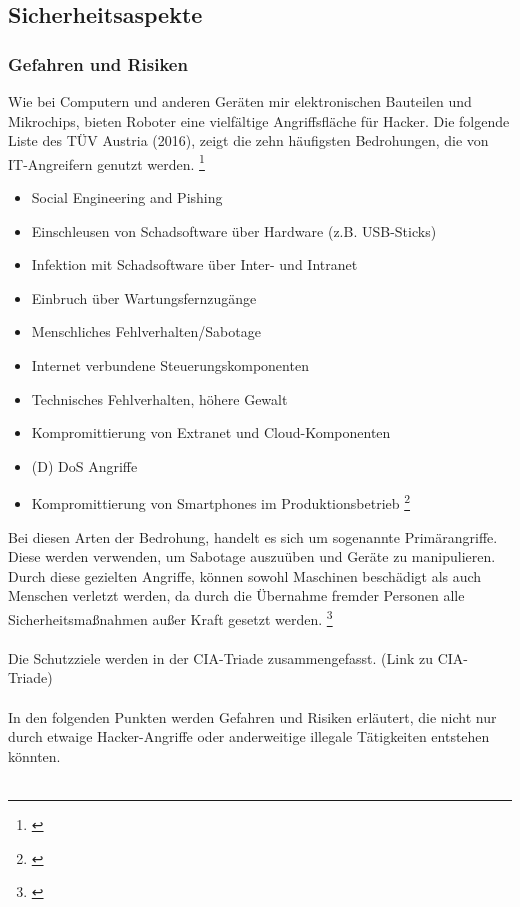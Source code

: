 \documentclass[titlepage,12pt,twoside]{article}
\begin{document}
\subsection{Sicherheitsaspekte}
\subsubsection{Gefahren und Risiken}
Wie bei Computern und anderen Geräten mir elektronischen Bauteilen und Mikrochips, 
bieten Roboter eine vielfältige Angriffsfläche für Hacker. Die folgende Liste des 
TÜV Austria (2016), zeigt die zehn häufigsten Bedrohungen, die von IT-Angreifern 
genutzt werden. \footnote{\cite{TÜVaustria}} \\
\begin{itemize}
	\item Social Engineering and Pishing
	\item Einschleusen von Schadsoftware über Hardware (z.B. USB-Sticks)
	\item Infektion mit Schadsoftware über Inter- und Intranet
	\item Einbruch über Wartungsfernzugänge
	\item Menschliches Fehlverhalten/Sabotage
	\item Internet verbundene Steuerungskomponenten
	\item Technisches Fehlverhalten, höhere Gewalt
	\item Kompromittierung von Extranet und Cloud-Komponenten
	\item (D) DoS Angriffe
	\item Kompromittierung von Smartphones im Produktionsbetrieb \footnote{\cite{TÜVaustria}}
\end{itemize}
\hfill \break
Bei diesen Arten der Bedrohung, handelt es sich um sogenannte Primärangriffe. 
Diese werden verwenden, um Sabotage auszuüben und Geräte zu manipulieren. Durch 
diese gezielten Angriffe, können sowohl Maschinen beschädigt als auch Menschen 
verletzt werden, da durch die Übernahme fremder Personen alle Sicherheitsmaßnahmen 
außer Kraft gesetzt werden. \footnote{\cite{TÜVaustria}}\\
\\
Die Schutzziele werden in der CIA-Triade zusammengefasst. (Link zu CIA-Triade) \\
\\
In den folgenden Punkten werden Gefahren und Risiken erläutert, die nicht nur 
durch etwaige Hacker-Angriffe oder anderweitige illegale Tätigkeiten entstehen 
könnten. \\
\\
\end{document}

